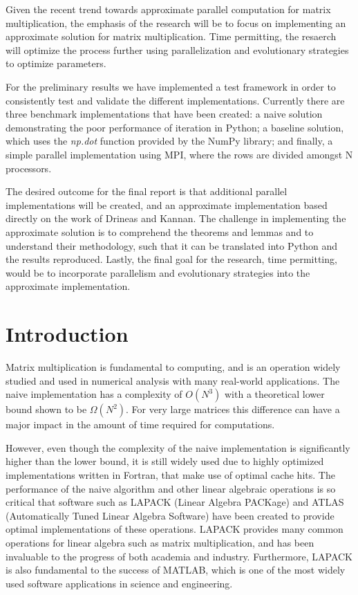 \documentclass[oneside]{article}
\begin{document}
Given the recent trend towards approximate parallel computation for matrix multiplication, the emphasis of the research will be to focus on implementing an approximate solution for matrix multiplication. Time permitting, the resaerch will optimize the process further using parallelization and evolutionary strategies to optimize parameters.

For the preliminary results we have implemented a test framework in order to consistently test and validate the different implementations. Currently there are three benchmark implementations that have been created: a naive solution demonstrating the poor performance of iteration in Python; a baseline solution, which uses the \emph{np.dot} function provided by the NumPy library; and finally, a simple parallel implementation using MPI, where the rows are divided amongst N processors.

The desired outcome for the final report is that additional parallel implementations will be created, and an approximate implementation based directly on the work of Drineas and Kannan\cite{drineas2001fast}. The challenge in implementing the approximate solution is to comprehend the theorems and lemmas and to understand their methodology, such that it can be translated into Python and the results reproduced. Lastly, the final goal for the research, time permitting, would be to incorporate parallelism and evolutionary strategies into the approximate implementation.



\section{Introduction}

Matrix multiplication is fundamental to computing, and is an operation widely studied and used in numerical analysis with many real-world applications. The naive implementation has a complexity of $O(N^{3})$\cite{raz2002complexity} with a theoretical lower bound shown to be $\Omega(N^{2})$\cite{raz2002complexity}. For very large matrices this difference can have a major impact in the amount of time required for computations.

However, even though the complexity of the naive implementation is significantly higher than the lower bound, it is still widely used due to highly optimized implementations written in Fortran, that make use of optimal cache hits\cite{note2002reducing}. The performance of the naive algorithm and other linear algebraic operations is so critical that software such as LAPACK (Linear Algebra PACKage)\cite{lapackweb} and ATLAS (Automatically Tuned Linear Algebra Software)\cite{whaley2001automated} have been created to provide optimal implementations of these operations. LAPACK provides many common operations for linear algebra such as matrix multiplication, and has been invaluable to the progress of both academia and industry. Furthermore, LAPACK is also fundamental to the success of MATLAB\cite{matlab2000}, which is one of the most widely used software applications in science and engineering.
\end{document}
